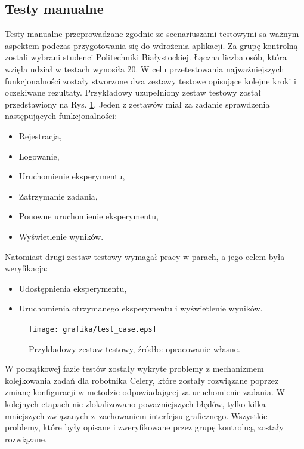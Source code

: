 \subsection{Testy manualne}
Testy manualne przeprowadzane zgodnie ze scenariuszami testowymi sa ważnym aspektem podczas przygotowania się do wdrożenia aplikacji. Za grupę kontrolną zostali wybrani studenci Politechniki Białystockiej. Łączna liczba osób, która wzięła udział w testach wynosiła 20. W celu przetestowania najważniejszych funkcjonalności zostały stworzone dwa zestawy testowe opisujące kolejne kroki i oczekiwane rezultaty. Przykładowy uzupełniony zestaw testowy został przedstawiony na Rys. \ref{rys21_test_case}. Jeden z zestawów miał za zadanie sprawdzenia następujących funkcjonalności: 
\begin{itemize}
	\item Rejestracja,
	\item Logowanie,
	\item Uruchomienie eksperymentu,
	\item Zatrzymanie zadania,
	\item Ponowne uruchomienie eksperymentu,
	\item Wyświetlenie wyników.
\end{itemize}
Natomiast drugi zestaw testowy wymagał pracy w parach, a jego celem była weryfikacja: 
\begin{itemize}
 	\item Udostępnienia eksperymentu,
 	\item Uruchomienia otrzymanego eksperymentu i wyświetlenie wyników.
\end{itemize}

\begin{figure}[htb]
	\centering
	\texttt{[image: grafika/test\_case.eps]}
	\caption{Przykładowy zestaw testowy, źródło: opracowanie własne.}
	\label{rys21_test_case}
\end{figure}

W początkowej fazie testów zostały wykryte problemy z mechanizmem kolejkowania zadań dla robotnika Celery, które zostały rozwiązane poprzez zmianę konfiguracji w metodzie odpowiadającej za uruchomienie zadania. W kolejnych etapach nie zlokalizowano poważniejszych błędów, tylko kilka mniejszych związanych z~zachowaniem interfejsu graficznego. Wszystkie problemy, które były opisane i zweryfikowane przez grupę kontrolną, zostały rozwiązane.